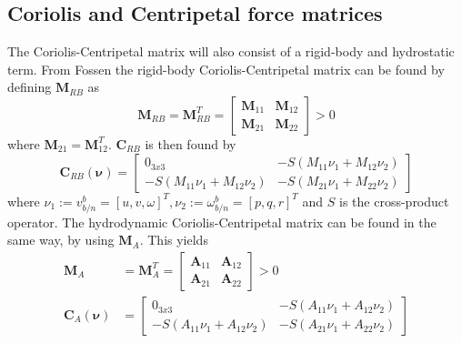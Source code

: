 \subsection{Coriolis and Centripetal force matrices}
The Coriolis-Centripetal matrix will also consist of a rigid-body and hydrostatic term. From Fossen \cite{Fossen} the rigid-body Coriolis-Centripetal matrix can be found by defining $\textbf{M}_{RB}$ as
\begin{equation}
    \mathbf{M}_{RB} = \mathbf{M}_{RB}^{T} = \begin{bmatrix}
    \mathbf{M}_{11} & \mathbf{M}_{12} \\
    \mathbf{M}_{21} & \mathbf{M}_{22}
    \end{bmatrix} > 0
\end{equation}
where $\textbf{M}_{21}=\textbf{M}_{12}^T$. $\mathbf{C}_{RB}$ is then found by
\begin{equation}
    \mathbf{C}_{RB}(\mathbf{\nu}) = \begin{bmatrix}
    0_{3x3} & -S(M_{11}\nu_{1}+M_{12}\nu_{2}) \\
    -S(M_{11}\nu_{1}+M_{12}\nu_{2}) & -S(M_{21}\nu_{1}+M_{22}\nu_{2})
    \end{bmatrix}
\end{equation}
where $\nu_{1} := v_{b/n}^{b} = [u, v, \omega]^{T}, \nu_{2} := \omega_{b/n}^{b}=[p, q, r]^{T}$ and $S$ is the cross-product operator. The hydrodynamic Coriolis-Centripetal matrix can be found in the same way, by using $\textbf{M}_{A}$. This yields
\begin{align}
    \mathbf{M}_{A} & = \mathbf{M}_{A}^{T} = \begin{bmatrix}
    \mathbf{A}_{11} & \mathbf{A}_{12} \\
    \mathbf{A}_{21} & \mathbf{A}_{22}
    \end{bmatrix} > 0 \\
    \mathbf{C}_{A}(\mathbf{\nu}) & = \begin{bmatrix}
    0_{3x3} & -S(A_{11}\nu_{1}+A_{12}\nu_{2}) \\
    -S(A_{11}\nu_{1}+A_{12}\nu_{2}) & -S(A_{21}\nu_{1}+A_{22}\nu_{2})
    \end{bmatrix}
\end{align}
